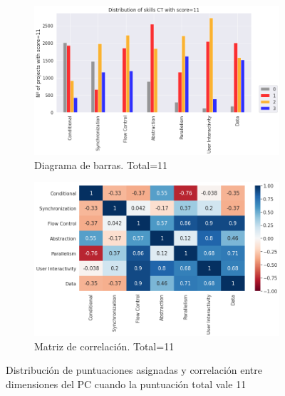 \documentclass[a4paper, 12pt]{book}
\begin{document}
\begin{figure}[H]
    \centering
    \begin{subfigure}[h]{.49\textwidth} 
        \includegraphics[width=\textwidth]{img/distribucion_11_Snap}
        \caption{Diagrama de barras. Total=11}
        \label{fig:total11_Snap}
    \end{subfigure}       
    \begin{subfigure}[h]{.49\textwidth} 
        \includegraphics[width=\textwidth]{img/corr_11_Snap}
        \caption{Matriz de correlación. Total=11}
        \label{fig:corr11_Snap}
    \end{subfigure}
    \caption{Distribución de puntuaciones asignadas y correlación entre dimensiones del PC cuando la puntuación total vale 11}
\end{figure}
\end{document}
